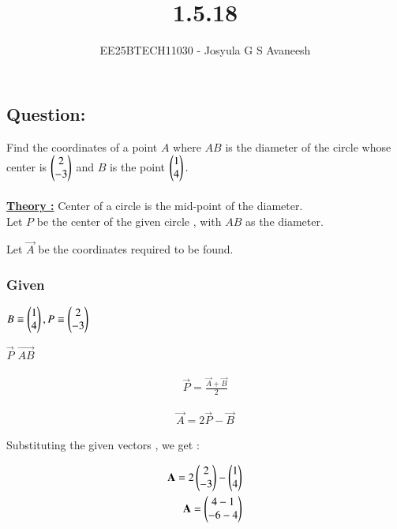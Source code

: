 \documentclass[journal]{IEEEtran}
\numberwithin{equation}{enumi}
\numberwithin{figure}{enumi}
\begin{document}

\vspace{3cm}

\title{1.5.18}
\author{EE25BTECH11030 - Josyula G S Avaneesh}
\maketitle

\subsection*{\textbf{Question:} } 
Find the coordinates of a point $A$ where $AB$ is the diameter of the circle whose center is  $\begin{pmatrix}2\\-3 \end{pmatrix}$ and $B$ is the point $\begin{pmatrix}1\\4\end{pmatrix}.$\\
\solution \\ 

\underline{\textbf{Theory :}} Center of a circle is the mid-point of the diameter. \\

Let $P$ be the center of the given circle , with $AB$ as the diameter.

Let $\vec{A}$ be the coordinates required to be found. 
\subsubsection*{Given }
 $B \equiv \begin{pmatrix}1 \\ 4\end{pmatrix} , P \equiv \begin{pmatrix}2\\-3\end{pmatrix}$ 
 
 $\vec{P}$  $\vec{AB}$ 

\begin{align}
    \vec{P} = \frac{\vec{A} + \vec{B}}{2}  
\end{align}

\begin{align}
    \vec{A}=2\vec{P}-\vec{B}
\end{align}

Substituting the given vectors , we get : 

\begin{align}
    \mathbf{A} = 2\begin{pmatrix}2\\-3\end{pmatrix} - \begin{pmatrix}1 \\ 4\end{pmatrix} \\ 
    \mathbf{A} = \begin{pmatrix} 4 - 1\\ -6 - 4  \end{pmatrix}      
\end{align}
\end{document}
